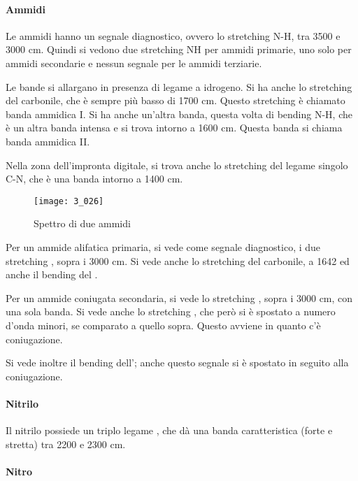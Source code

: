 \paragraph{Ammidi}

Le ammidi hanno un segnale diagnostico, ovvero lo stretching N-H, tra
3500 e 3000 cm. Quindi si vedono due stretching NH per ammidi
primarie, uno solo per ammidi secondarie e nessun segnale per le ammidi
terziarie.

Le bande si allargano in presenza di legame a idrogeno.
Si ha anche lo stretching del carbonile, che è sempre più basso di 1700
cm. Questo stretching è chiamato banda ammidica I.
Si ha anche un'altra banda, questa volta di bending N-H, che è un altra
banda intensa e si trova intorno a 1600 cm. Questa banda si chiama
banda ammidica II.

Nella zona dell'impronta digitale, si trova anche lo stretching del
legame singolo C-N, che è una banda intorno a 1400 cm.

\begin{figure}[H]
    \texttt{[image: 3\_026]}
    \caption{Spettro di due ammidi}
\end{figure}

Per un ammide alifatica primaria, si vede come segnale diagnostico, i
due stretching , sopra i 3000 cm. Si vede anche lo stretching del
carbonile, a 1642 ed anche il bending del .

Per un ammide coniugata secondaria, si vede lo stretching , sopra i
3000 cm, con una sola banda. Si vede anche lo stretching , che però
si è spostato a numero d'onda minori, se comparato a quello sopra.
Questo avviene in quanto c'è coniugazione.

Si vede inoltre il bending dell'; anche questo segnale si è spostato
in seguito alla coniugazione.


\paragraph{Nitrilo}

Il nitrilo possiede un triplo legame , che dà una banda
caratteristica (forte e stretta) tra 2200 e 2300 cm.

\paragraph{Nitro}

